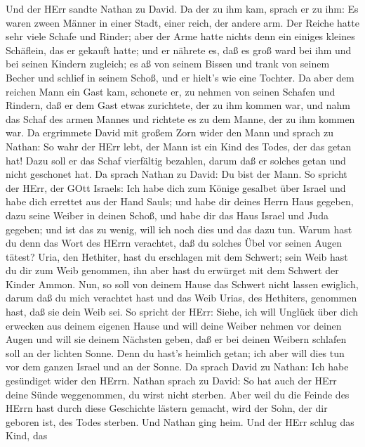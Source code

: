  Und der HErr sandte Nathan zu David. Da der zu ihm kam,
sprach er zu ihm: Es waren zween Männer in einer Stadt, einer reich, der
andere arm.  Der Reiche hatte sehr viele Schafe und Rinder;
 aber der Arme hatte nichts denn ein einiges kleines
Schäflein, das er gekauft hatte; und er nährete es, daß es groß ward bei
ihm und bei seinen Kindern zugleich; es aß von seinem Bissen und trank
von seinem Becher und schlief in seinem Schoß, und er hielt's wie eine
Tochter.  Da aber dem reichen Mann ein Gast kam, schonete
er, zu nehmen von seinen Schafen und Rindern, daß er dem Gast etwas
zurichtete, der zu ihm kommen war, und nahm das Schaf des armen Mannes
und richtete es zu dem Manne, der zu ihm kommen war.  Da
ergrimmete David mit großem Zorn wider den Mann und sprach zu Nathan: So
wahr der HErr lebt, der Mann ist ein Kind des Todes, der das getan hat!
 Dazu soll er das Schaf vierfältig bezahlen, darum daß er
solches getan und nicht geschonet hat.  Da sprach Nathan zu
David: Du bist der Mann. So spricht der HErr, der GOtt Israels: Ich habe
dich zum Könige gesalbet über Israel und habe dich errettet aus der Hand
Sauls;  und habe dir deines Herrn Haus gegeben, dazu seine
Weiber in deinen Schoß, und habe dir das Haus Israel und Juda gegeben;
und ist das zu wenig, will ich noch dies und das dazu tun. 
Warum hast du denn das Wort des HErrn verachtet, daß du solches Übel vor
seinen Augen tätest? Uria, den Hethiter, hast du erschlagen mit dem
Schwert; sein Weib hast du dir zum Weib genommen, ihn aber hast du
erwürget mit dem Schwert der Kinder Ammon.  Nun, so soll
von deinem Hause das Schwert nicht lassen ewiglich, darum daß du mich
verachtet hast und das Weib Urias, des Hethiters, genommen hast, daß sie
dein Weib sei.  So spricht der HErr: Siehe, ich will
Unglück über dich erwecken aus deinem eigenen Hause und will deine
Weiber nehmen vor deinen Augen und will sie deinem Nächsten geben, daß
er bei deinen Weibern schlafen soll an der lichten Sonne. 
Denn du hast's heimlich getan; ich aber will dies tun vor dem ganzen
Israel und an der Sonne.  Da sprach David zu Nathan: Ich
habe gesündiget wider den HErrn. Nathan sprach zu David: So hat auch der
HErr deine Sünde weggenommen, du wirst nicht sterben.  Aber
weil du die Feinde des HErrn hast durch diese Geschichte lästern
gemacht, wird der Sohn, der dir geboren ist, des Todes sterben.
 Und Nathan ging heim. Und der HErr schlug das Kind, das
